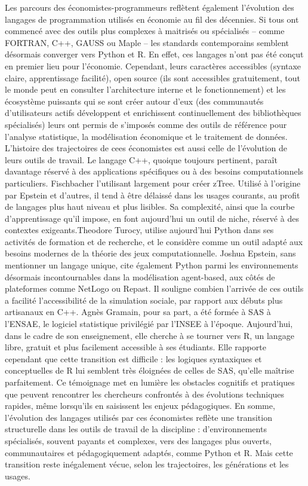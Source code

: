 Les parcours des économistes-programmeurs reflètent également l’évolution des langages de programmation utilisés en économie au fil des décennies. Si tous ont commencé avec des outils plus complexes à maitrisés ou spécialisés – comme FORTRAN, C++, GAUSS ou Maple – les standards contemporains semblent désormais converger vers Python et R. En effet, ces langages n'ont pas été conçut en premier lieu pour l'économie. Cependant, leurs caractères accessibles (syntaxe claire, apprentissage facilité), open source (ils sont accessibles gratuitement, tout le monde peut en consulter l'architecture interne et le fonctionnement) et les écosystème puissants qui se sont créer autour d'eux (des communautés d'utilisateurs actifs développent et enrichissent continuellement des bibliothèques spécialisés) leurs ont permis de s'imposés comme des outils de référence pour l’analyse statistique, la modélisation économique et le traitement de données. L’histoire des trajectoires de cees économistes est aussi celle de l’évolution de leurs outils de travail. Le langage C++, quoique toujours pertinent, paraît davantage réservé à des applications spécifiques ou à des besoins computationnels particuliers. Fischbacher l’utilisant largement pour créer zTree. Utilisé à l’origine par Epstein et d’autres, il tend à être délaissé dans les usages courants, au profit de langages plus haut niveau et plus lisibles. Sa complexité, ainsi que la courbe d’apprentissage qu’il impose, en font aujourd’hui un outil de niche, réservé à des contextes exigeants.Theodore Turocy, utilise aujourd’hui Python dans ses activités de formation et de recherche, et le considère comme un outil adapté aux besoins modernes de la théorie des jeux computationnelle. Joshua Epstein, sans mentionner un langage unique, cite également Python parmi les environnements désormais incontournables dans la modélisation agent-based, aux côtés de plateformes comme NetLogo ou Repast. Il souligne combien l’arrivée de ces outils a facilité l’accessibilité de la simulation sociale, par rapport aux débuts plus artisanaux en C++. Agnès Gramain, pour sa part, a été formée à SAS à l’ENSAE, le logiciel statistique privilégié par l’INSEE à l’époque. Aujourd’hui, dans le cadre de son enseignement, elle cherche à se tourner vers R, un langage libre, gratuit et plus facilement accessible à ses étudiants. Elle rapporte cependant que cette transition est difficile : les logiques syntaxiques et conceptuelles de R lui semblent très éloignées de celles de SAS, qu’elle maîtrise parfaitement. Ce témoignage met en lumière les obstacles cognitifs et pratiques que peuvent rencontrer les chercheurs confrontés à des évolutions techniques rapides, même lorsqu’ils en saisissent les enjeux pédagogiques. En somme, l’évolution des langages utilisés par ces économistes reflète une transition structurelle dans les outils de travail de la discipline : d’environnements spécialisés, souvent payants et complexes, vers des langages plus ouverts, communautaires et pédagogiquement adaptés, comme Python et R. Mais cette transition reste inégalement vécue, selon les trajectoires, les générations et les usages.


